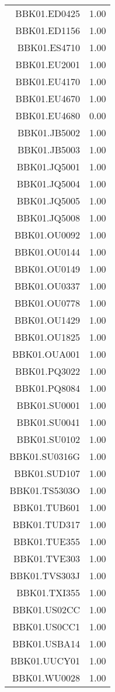 \begin{table}[ht]
\begin{tabular}{rr}
  BBK01.ED0425 & 1.00 \\ 
  BBK01.ED1156 & 1.00 \\ 
  BBK01.ES4710 & 1.00 \\ 
  BBK01.EU2001 & 1.00 \\ 
  BBK01.EU4170 & 1.00 \\ 
  BBK01.EU4670 & 1.00 \\ 
  BBK01.EU4680 & 0.00 \\ 
  BBK01.JB5002 & 1.00 \\ 
  BBK01.JB5003 & 1.00 \\ 
  BBK01.JQ5001 & 1.00 \\ 
  BBK01.JQ5004 & 1.00 \\ 
  BBK01.JQ5005 & 1.00 \\ 
  BBK01.JQ5008 & 1.00 \\ 
  BBK01.OU0092 & 1.00 \\ 
  BBK01.OU0144 & 1.00 \\ 
  BBK01.OU0149 & 1.00 \\ 
  BBK01.OU0337 & 1.00 \\ 
  BBK01.OU0778 & 1.00 \\ 
  BBK01.OU1429 & 1.00 \\ 
  BBK01.OU1825 & 1.00 \\ 
  BBK01.OUA001 & 1.00 \\ 
  BBK01.PQ3022 & 1.00 \\ 
  BBK01.PQ8084 & 1.00 \\ 
  BBK01.SU0001 & 1.00 \\ 
  BBK01.SU0041 & 1.00 \\ 
  BBK01.SU0102 & 1.00 \\ 
  BBK01.SU0316G & 1.00 \\ 
  BBK01.SUD107 & 1.00 \\ 
  BBK01.TS5303O & 1.00 \\ 
  BBK01.TUB601 & 1.00 \\ 
  BBK01.TUD317 & 1.00 \\ 
  BBK01.TUE355 & 1.00 \\ 
  BBK01.TVE303 & 1.00 \\ 
  BBK01.TVS303J & 1.00 \\ 
  BBK01.TXI355 & 1.00 \\ 
  BBK01.US02CC & 1.00 \\ 
  BBK01.US0CC1 & 1.00 \\ 
  BBK01.USBA14 & 1.00 \\ 
  BBK01.UUCY01 & 1.00 \\ 
  BBK01.WU0028 & 1.00 \\ 

\end{tabular}
\end{table}
